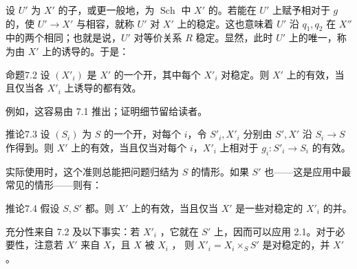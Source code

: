 设 $U'$ 为 $X'$ 的子，或更一般地，为 $\operatorname{Sch}$ 中 $X'$ 的。若能在 $U'$ 上赋予相对于 $g$ 的，使 $U'\to X'$ 与相容，就称 $U'$ 对 $X'$ 上的稳定。这也意味着 $U'$ 沿 $q_1,q_2$ 在 $X''$ 中的两个相同；也就是说，$U'$ 对等价关系 $R$ 稳定。显然，此时 $U'$ 上的唯一，称为由 $X'$ 上的诱导的。于是：

\begin{SGAresult}{命题}{7.2}
设 $(X'_i)$ 是 $X'$ 的一个开，其中每个 $X'_i$ 对稳定。则 $X'$ 上的有效，当且仅当各 $X'_i$ 上诱导的都有效。
\end{SGAresult}
例如，这容易由 7.1 推出；证明细节留给读者。

\begin{SGAresult}{推论}{7.3}
设 $(S_i)$ 为 $S$ 的一个开，对每个 $i$，令 $S'_i,X'_i$ 分别由 $S',X'$ 沿 $S_i\to S$ 作得到。则 $X'$ 上的有效，当且仅当对每个 $i$，$X'_i$ 上相对于 $g_i:S'_i\to S_i$ 的有效。
\end{SGAresult}
实际使用时，这个准则总能把问题归结为 $S$ 的情形。如果 $S'$ 也——这是应用中最常见的情形——则有：
\begin{SGAresult}{推论}{7.4}
假设 $S,S'$ 都。则 $X'$ 上的有效，当且仅当 $X'$ 是一些对稳定的 $X'_i$ 的并。
\end{SGAresult}
充分性来自 7.2 及以下事实：若 $X'_i$ ，它就在 $S'$ 上，因而可以应用 2.1。对于必要性，注意若 $X'$ 来自 $X$，且 $X$ 被 $X_i$ ，
则 $X'_i=X_i\times_S S'$ 是对稳定的，并 $X'$。

